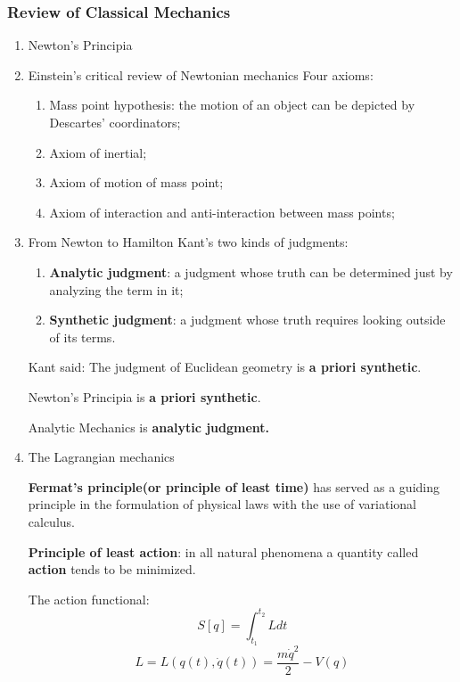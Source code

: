 \documentclass[12pt]{article}
\numberwithin{equation}{section}
\begin{document}
\subsubsection{Review of Classical Mechanics}
\begin{enumerate}
\item Newton's Principia
\item Einstein's critical review of Newtonian mechanics
	Four axioms:
	\begin{enumerate}
	\item Mass point hypothesis: the motion of an object can be depicted by Descartes' coordinators;
	\item Axiom of inertial;
	\item Axiom of motion of mass point;
	\item Axiom of interaction and anti-interaction between mass points;
	\end{enumerate}
\item From Newton to Hamilton
	Kant's two kinds of judgments:
	\begin{enumerate}
	\item \textbf{Analytic judgment}: a judgment whose truth can be determined just by analyzing the term in it;
	\item \textbf{Synthetic judgment}: a judgment whose truth requires looking outside of its terms.
	\end{enumerate}
	Kant said: The judgment of Euclidean geometry is \textbf{a priori synthetic}.\par
	Newton's Principia is \textbf{a priori synthetic}.\par
	Analytic Mechanics is \textbf{analytic judgment.}
\item The Lagrangian mechanics\par
	\textbf{Fermat's principle(or principle of least time)} has served as a guiding principle in the formulation of physical laws with the use of variational calculus. \par
	{\color{red}\textbf{Principle of least action}}: in all natural phenomena a quantity called \textbf{action} tends to be minimized. \par
	The action functional: 
	\begin{equation}
		S[q]=\int_{t_1}^{t_2}Ldt
	\end{equation}
	\begin{equation}
		L=L(q(t),\dot{q}(t))=\frac{m\dot{q}^2}{2}-V(q)
	\end{equation}
	\begin{equation}

\end{equation}
\end{enumerate}
\end{document}
